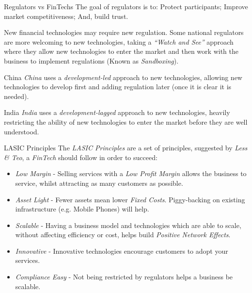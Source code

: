 \documentclass[11pt,a4paper]{article}
\begin{document}
  \begin{remark}{Regulators vs FinTechs}
    The goal of regulators is to: Protect participants; Improve market competitiveness; And, build trust.
    \par New financial technologies may require new regulation. Some national regulators are more welcoming to new technologies, taking a \textit{``Watch and See''} approach where they allow new technologies to enter the market and then work with the business to implement regulations (Known as \textit{Sandboxing}).
  \end{remark}

  \begin{remark}{China}
    \textit{China} uses a \textit{development-led} approach to new technologies, allowing new technologies to develop first and adding regulation later (once it is clear it is needed).
  \end{remark}

  \begin{remark}{India}
    \textit{India} uses a \textit{development-lagged} approach to new technologies, heavily restricting the ability of new technologies to enter the market before they are well understood.
  \end{remark}

  \begin{definition}{LASIC Principles}
    The \textit{LASIC Principles} are a set of principles, suggested by \textit{Less \& Teo}, a \textit{FinTech} should follow in order to succeed:
    \begin{itemize}
      \item \textit{Low Margin} - Selling services with a \textit{Low Profit Margin} allows the business to service, whilst attracting as many customers as possible.
      \item \textit{Asset Light} - Fewer assets mean lower \textit{Fixed Costs}. Piggy-backing on existing infrastructure (e.g. Mobile Phones) will help.
      \item \textit{Scalable} - Having a business model and technologies which are able to scale, without affecting efficiency or cost, helps build \textit{Positive Network Effects}.
      \item \textit{Innovative} - Innovative technologies encourage customers to adopt your services.
      \item \textit{Compliance Easy} - Not being restricted by regulators helps a business be scalable.
    \end{itemize}
  \end{definition}
\end{document}
